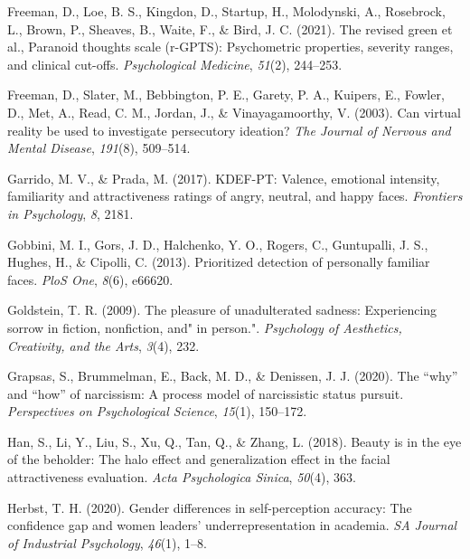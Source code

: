 \documentclass[
  man,floatsintext]{apa6}
\newlength{\cslhangindent}
\newlength{\cslentryspacingunit} %
\newenvironment{CSLReferences}[2] %
 {%
  \setlength{\parindent}{0pt}
  \ifodd #1
  \let\oldpar\par
  \def\par{\hangindent=\cslhangindent\oldpar}
  \fi
  \setlength{\parskip}{#2\cslentryspacingunit}
 }%
 {}
\begin{document}
\begin{CSLReferences}{1}{0}
\leavevmode{}%
Freeman, D., Loe, B. S., Kingdon, D., Startup, H., Molodynski, A., Rosebrock, L., Brown, P., Sheaves, B., Waite, F., \& Bird, J. C. (2021). The revised green et al., Paranoid thoughts scale (r-GPTS): Psychometric properties, severity ranges, and clinical cut-offs. \emph{Psychological Medicine}, \emph{51}(2), 244--253.

\leavevmode{}%
Freeman, D., Slater, M., Bebbington, P. E., Garety, P. A., Kuipers, E., Fowler, D., Met, A., Read, C. M., Jordan, J., \& Vinayagamoorthy, V. (2003). Can virtual reality be used to investigate persecutory ideation? \emph{The Journal of Nervous and Mental Disease}, \emph{191}(8), 509--514.

\leavevmode{}%
Garrido, M. V., \& Prada, M. (2017). KDEF-PT: Valence, emotional intensity, familiarity and attractiveness ratings of angry, neutral, and happy faces. \emph{Frontiers in Psychology}, \emph{8}, 2181.

\leavevmode{}%
Gobbini, M. I., Gors, J. D., Halchenko, Y. O., Rogers, C., Guntupalli, J. S., Hughes, H., \& Cipolli, C. (2013). Prioritized detection of personally familiar faces. \emph{PloS One}, \emph{8}(6), e66620.

\leavevmode{}%
Goldstein, T. R. (2009). The pleasure of unadulterated sadness: Experiencing sorrow in fiction, nonfiction, and" in person.". \emph{Psychology of Aesthetics, Creativity, and the Arts}, \emph{3}(4), 232.

\leavevmode{}%
Grapsas, S., Brummelman, E., Back, M. D., \& Denissen, J. J. (2020). The {``why''} and {``how''} of narcissism: A process model of narcissistic status pursuit. \emph{Perspectives on Psychological Science}, \emph{15}(1), 150--172.

\leavevmode{}%
Han, S., Li, Y., Liu, S., Xu, Q., Tan, Q., \& Zhang, L. (2018). Beauty is in the eye of the beholder: The halo effect and generalization effect in the facial attractiveness evaluation. \emph{Acta Psychologica Sinica}, \emph{50}(4), 363.

\leavevmode{}%
Herbst, T. H. (2020). Gender differences in self-perception accuracy: The confidence gap and women leaders' underrepresentation in academia. \emph{SA Journal of Industrial Psychology}, \emph{46}(1), 1--8.


\end{CSLReferences}
\end{document}
